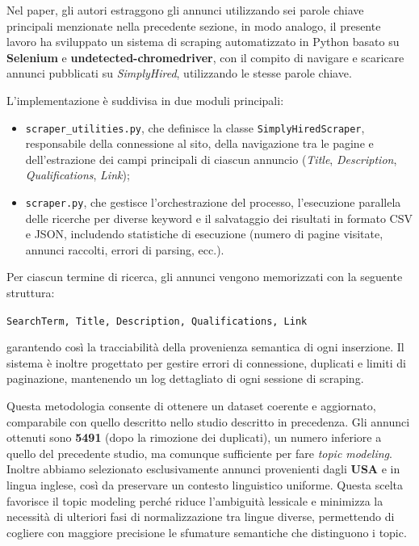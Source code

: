 Nel paper, gli autori estraggono gli annunci utilizzando sei parole chiave principali menzionate nella precedente sezione, in modo analogo, il presente lavoro ha sviluppato un sistema di scraping automatizzato in Python basato su \textbf{Selenium} e \textbf{undetected-chromedriver}, con il compito di navigare e scaricare annunci pubblicati su \textit{SimplyHired}, utilizzando le stesse parole chiave.

L’implementazione è suddivisa in due moduli principali:
\begin{itemize}
    \item \texttt{scraper\_utilities.py}, che definisce la classe \texttt{SimplyHiredScraper}, responsabile della connessione al sito, della navigazione tra le pagine e dell’estrazione dei campi principali di ciascun annuncio (\textit{Title}, \textit{Description}, \textit{Qualifications}, \textit{Link});
    \item \texttt{scraper.py}, che gestisce l’orchestrazione del processo, l’esecuzione parallela delle ricerche per diverse keyword e il salvataggio dei risultati in formato CSV e JSON, includendo statistiche di esecuzione (numero di pagine visitate, annunci raccolti, errori di parsing, ecc.).
\end{itemize}

Per ciascun termine di ricerca, gli annunci vengono memorizzati con la seguente struttura:

\begin{center}
\texttt{SearchTerm, Title, Description, Qualifications, Link}
\end{center}

garantendo così la tracciabilità della provenienza semantica di ogni inserzione.  
Il sistema è inoltre progettato per gestire errori di connessione, duplicati e limiti di paginazione, mantenendo un log dettagliato di ogni sessione di scraping.

Questa metodologia consente di ottenere un dataset coerente e aggiornato, comparabile con quello descritto nello studio descritto in precedenza.
Gli annunci ottenuti sono \textbf{5491} (dopo la rimozione dei duplicati), un numero inferiore a quello del precedente studio, ma comunque sufficiente per fare \textit{topic modeling}.
Inoltre abbiamo selezionato esclusivamente annunci provenienti dagli \textbf{USA} e in lingua inglese, così da preservare un contesto linguistico uniforme. Questa scelta favorisce il topic modeling perché riduce l'ambiguità lessicale e minimizza la necessità di ulteriori fasi di normalizzazione tra lingue diverse, permettendo di cogliere con maggiore precisione le sfumature semantiche che distinguono i topic.